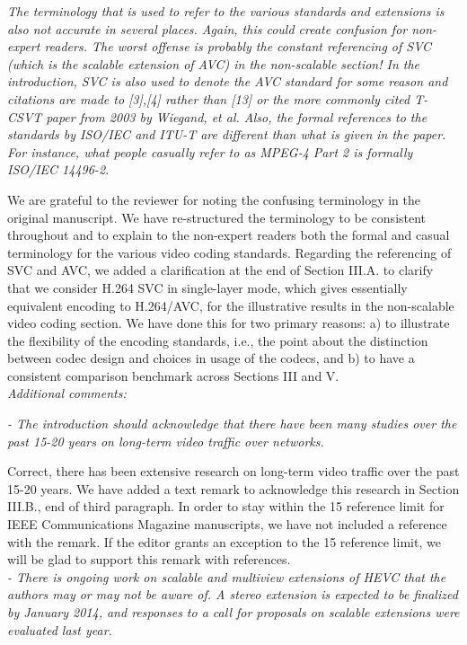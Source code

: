 \documentclass[11pt, draftclsnofoot, onecolumn]{IEEEtran}
\begin{document}
{{\noindent \textit{The terminology that is used to refer to the various
  standards and extensions is also not accurate in several places.
  Again, this could create confusion for non-expert readers. The worst
  offense is probably the constant referencing of SVC (which is the
  scalable extension of AVC) in the non-scalable section!  In the
  introduction, SVC is also used to denote the AVC standard for some
  reason and citations are made to [3],[4] rather than [13] or the
  more commonly cited T-CSVT paper from 2003 by Wiegand, et al. Also,
  the formal references to the standards by ISO/IEC and ITU-T are
  different than what is given in the paper. For instance, what people
  casually refer to as MPEG-4 Part 2 is formally ISO/IEC 14496-2.}

We are grateful to the reviewer for noting the confusing terminology
in the original manuscript. We have re-structured the terminology
to be consistent throughout and to explain to the
non-expert readers both the formal and casual terminology for
the various video coding standards.
Regarding the referencing of SVC and AVC, we added a clarification
at the end of Section III.A. to clarify that we consider
H.264 SVC in single-layer mode, which gives
essentially equivalent encoding to H.264/AVC,
for the illustrative results in the non-scalable video coding section.
We have done this for two primary reasons: a) to illustrate the
flexibility of the encoding standards, i.e., the point about the
distinction between codec design and choices in usage of the codecs, and
b) to have a consistent comparison benchmark across Sections III and V.\\

\noindent \textit{Additional comments:}

\noindent \textit{ - The introduction should acknowledge that there
  have been many studies over the past 15-20 years on long-term video
  traffic over networks.}

Correct, there has been extensive research on long-term video
traffic over the past 15-20 years. We have added a text remark
to acknowledge this research in Section III.B., end of third paragraph.
In order to stay within the 15 reference limit for IEEE Communications
Magazine manuscripts, we have not included a reference with the remark.
If the editor grants an exception to the 15 reference limit, we will
be glad to support this remark with references.\\

\noindent \textit{ - There is ongoing work on scalable and multiview
  extensions of HEVC that the authors may or may not be aware of. A
  stereo extension is expected to be finalized by January 2014, and
  responses to a call for proposals on scalable extensions were
  evaluated last year.}

}}
\end{document}
